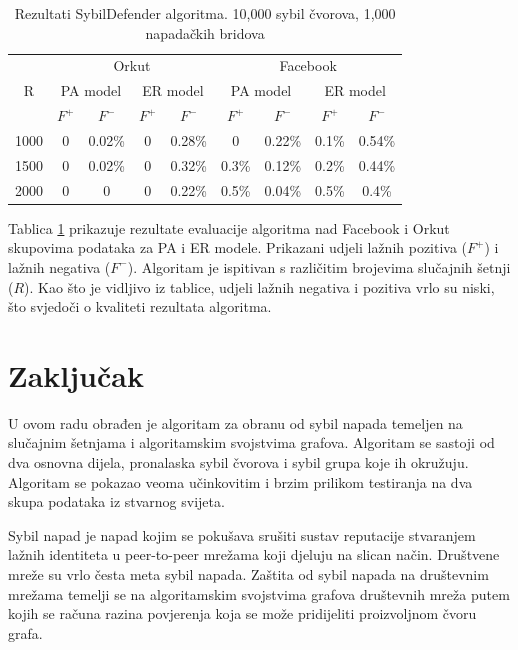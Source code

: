 \documentclass[times, utf8, seminar, numeric]{fer}
\begin{document}
\begin{table}[!h]
	\centering
	\caption{Rezultati SybilDefender algoritma. 10,000 sybil čvorova, 1,000 napadačkih bridova}
	\label{tbl:results}
	
	\begin{tabular}{|c|c|c|c|c|c|c|c|c|} \hline
    \multirow{3}{*}{R} & \multicolumn{4}{c|}{Orkut} & \multicolumn{4}{c|}{Facebook} \\
    & \multicolumn{2}{c}{PA model} & \multicolumn{2}{c|}{ER model} & \multicolumn{2}{c}{PA model} & \multicolumn{2}{c|}{ER model} \\
    & \multicolumn{1}{c}{$F^+$} & \multicolumn{1}{c}{$F^-$} & \multicolumn{1}{c}{$F^+$} & \multicolumn{1}{c|}{$F^-$} & \multicolumn{1}{c}{$F^+$} & \multicolumn{1}{c}{$F^-$} & \multicolumn{1}{c}{$F^+$} & \multicolumn{1}{c|}{$F^-$} \\ \hline
    1000 & 0 & 0.02\% & 0 & 0.28\% & 0 & 0.22\% & 0.1\% & 0.54\% \\
    1500 & 0 & 0.02\% & 0 & 0.32\% & 0.3\% & 0.12\% & 0.2\% & 0.44\% \\
    2000 & 0 & 0 & 0 & 0.22\% & 0.5\% & 0.04\% & 0.5\% & 0.4\% \\
		\hline
	\end{tabular}
\end{table}

Tablica \ref{tbl:results} prikazuje rezultate evaluacije algoritma nad Facebook i Orkut skupovima podataka za PA i ER modele. Prikazani udjeli lažnih pozitiva ($F^+$) i lažnih negativa ($F^-$). Algoritam je ispitivan s različitim brojevima slučajnih šetnji ($R$). Kao što je vidljivo iz tablice, udjeli lažnih negativa i pozitiva vrlo su niski, što svjedoči o kvaliteti rezultata algoritma.

\chapter{Zaključak} \label{ch:conclusion}
U ovom radu obrađen je algoritam za obranu od sybil napada temeljen na slučajnim šetnjama i algoritamskim svojstvima grafova. Algoritam se sastoji od dva osnovna dijela, pronalaska sybil čvorova i sybil grupa koje ih okružuju. Algoritam se pokazao veoma učinkovitim i brzim prilikom testiranja na dva skupa podataka iz stvarnog svijeta.




\begin{sazetak}
  Sybil napad je napad kojim se pokušava srušiti sustav reputacije stvaranjem lažnih identiteta u peer-to-peer mrežama koji djeluju na slican način. Društvene mreže su vrlo česta meta sybil napada. Zaštita od sybil napada na društevnim mrežama temelji se na algoritamskim svojstvima grafova društevnih mreža putem kojih se računa razina povjerenja koja se može pridijeliti proizvoljnom čvoru grafa.

\end{sazetak}
\end{document}
